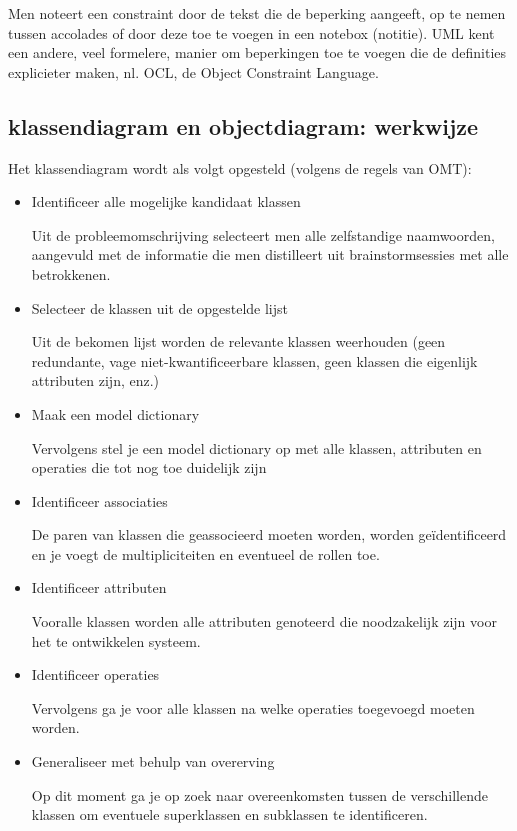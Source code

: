 Men noteert een constraint door de tekst die de beperking aangeeft, op te nemen tussen accolades of door deze toe te voegen in een notebox (notitie). UML kent een andere, veel formelere, manier om beperkingen toe te voegen die de definities explicieter maken, nl. OCL, de Object Constraint Language.

\subsection{klassendiagram en objectdiagram: werkwijze}

Het klassendiagram wordt als volgt opgesteld (volgens de regels van OMT):

\begin{itemize}
    \item Identificeer alle mogelijke kandidaat klassen
    
    Uit de probleemomschrijving selecteert men alle zelfstandige naamwoorden, aangevuld met de informatie die men distilleert uit brainstormsessies met alle betrokkenen.
    \item Selecteer de klassen uit de opgestelde lijst
    
    Uit de bekomen lijst worden de relevante klassen weerhouden (geen redundante, vage niet-kwantificeerbare klassen, geen klassen die eigenlijk attributen zijn, enz.)
    \item Maak een model dictionary
    
    Vervolgens stel je een model dictionary op met alle klassen, attributen en operaties die tot nog toe duidelijk zijn
    \item Identificeer associaties
    
    De paren van klassen die geassocieerd moeten worden, worden geïdentificeerd en je voegt de multipliciteiten en eventueel de rollen toe.
    \item Identificeer attributen
    
    Vooralle klassen worden alle attributen genoteerd die noodzakelijk zijn voor het te ontwikkelen systeem.
    \item Identificeer operaties
    
    Vervolgens ga je voor alle klassen na welke operaties toegevoegd moeten worden.
    \item Generaliseer met behulp van overerving
    
    Op dit moment ga je op zoek naar overeenkomsten tussen de verschillende klassen om eventuele superklassen en subklassen te identificeren.
    

\end{itemize}
